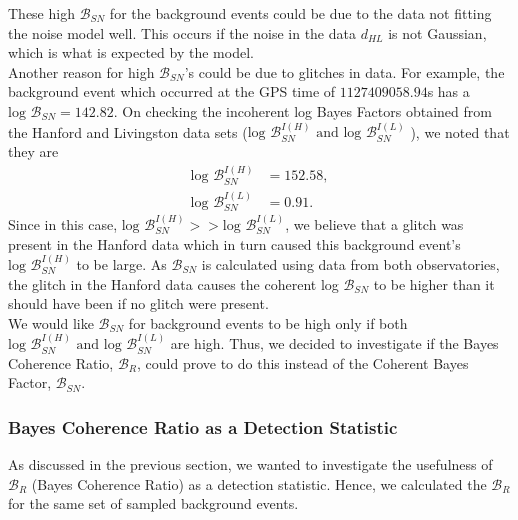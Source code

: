 \documentclass{article}
\begin{document}
  
 
 
 
 These high $\mathcal{B}_{SN}$ for the background events could be due to the data not fitting the noise model well. This occurs if the noise in the data $d_{HL}$ is not Gaussian, which is what is expected by the model.\\
 
  Another reason for high $\mathcal{B}_{SN}$'s could be due to glitches in data. For example, the background event which occurred at the GPS time of $1127409058.94$s has a $\text{log }\mathcal{B}_{SN} = 142.82$. On checking the incoherent log Bayes Factors obtained from the Hanford and Livingston data sets ($	\text{log }\mathcal{B}_{SN}^{I(H)}\text{ and } 	\text{log }\mathcal{B}_{SN}^{I(L)}$ ), we noted that they are 
 \begin{align*}
 	\text{log }\mathcal{B}_{SN}^{I(H)}&=152.58, \\
 	\text{log }\mathcal{B}_{SN}^{I(L)} &=0.91.
 	\end{align*}
 Since  in this case, $\text{log }\mathcal{B}_{SN}^{I(H)} > > \text{log }\mathcal{B}_{SN}^{I(L)}$, we believe that a glitch was present in the Hanford data which in turn caused this background event's $\text{log }\mathcal{B}_{SN}^{I(H)}$ to be large. As $\mathcal{B}_{SN}$ is calculated using data from both observatories, the glitch in the Hanford data causes the coherent log $\mathcal{B}_{SN}$ to be higher than it should have been if no glitch were present.\\
 
 
 
 
  We would like $\mathcal{B}_{SN}$ for background events to be high only if both $\text{log }\mathcal{B}_{SN}^{I(H)}\text{ and } 	\text{log }\mathcal{B}_{SN}^{I(L)}$ are high. Thus, we decided to investigate if the  Bayes Coherence Ratio, $\mathcal{B}_{R}$, could prove to do this instead of the Coherent Bayes Factor, $\mathcal{B}_{SN}$.
  
  
 
 \subsubsection{Bayes Coherence Ratio as a Detection Statistic}
 
 
 As discussed in the previous section, we wanted to investigate the usefulness of $\mathcal{B}_{R}$ (Bayes Coherence Ratio) as a detection statistic. Hence, we calculated the $\mathcal{B}_{R}$ for the same set of sampled background events.\\
 
\end{document}
